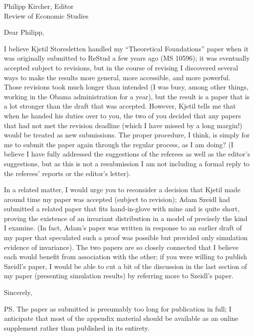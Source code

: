 \documentclass[12pt]{letter}
\begin{document}
\begin{letter}{
Philipp Kircher, Editor \\
Review of Economic Studies
}

\opening{Dear Philipp,}

I believe Kjetil Storesletten handled my ``Theoretical Foundations''
paper when it was originally submitted to ReStud a few years ago (MS
10596); it was eventually accepted subject to revisions, but in the
course of revising I discovered several ways to make the results more
general, more accessible, and more powerful.  Those revisions took
much longer than intended (I was busy, among other things, working in
the Obama administration for a year), but the result is a paper that
is a lot stronger than the draft that was accepted.  However, Kjetil
tells me that when he handed his duties over to you, the two of you
decided that any papers that had not met the revision deadline (which
I have missed by a long margin!)  would be treated as new submissions.
The proper procedure, I think, is simply for me to submit the paper
again through the regular process, as I am doing?  (I believe I have
fully addressed the suggestions of the referees as well as the
editor's suggestions, but as this is not a resubmission I am not including a
formal reply to the referees' reports or the editor's letter).

In a related matter, I would urge you to reconsider a decision that
Kjetil made around time my paper was accepted (subject to revision);
Adam Szeidl had submitted a related paper that fits hand-in-glove with
mine and is quite short, proving the existence of an invariant
distribution in a model of precisely the kind I examine.  (In fact,
Adam's paper was written in response to an earlier draft of my paper
that speculated such a proof was possible but provided only simulation
evidence of invariance).  The two papers are so closely connected that
I believe each would benefit from association with the other; if you
were willing to publish Szeidl's paper, I would be able to cut a bit
of the discussion in the last section of my paper (presenting
simulation results) by referring more to Szeidl's paper.

\closing{Sincerely,}

\ps{The paper as submitted is presumably too long for publication in
  full; I anticipate that most of the appendix material should be
  available as an online supplement rather than published in its
  entirety.}

\end{letter}
\end{document}
